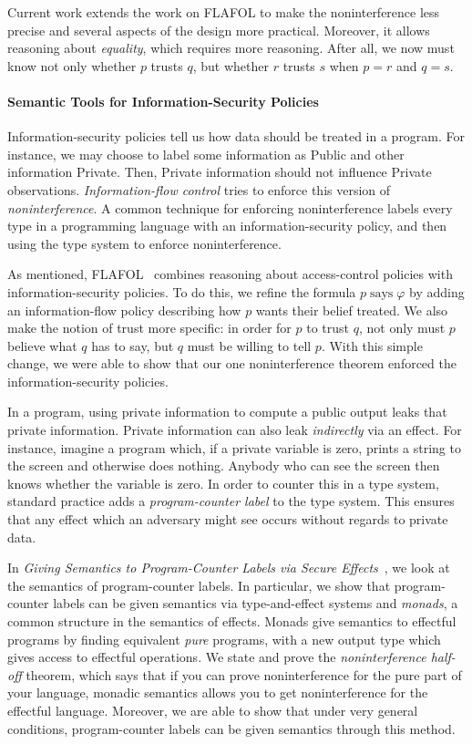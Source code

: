 \documentclass{article}
\theoremstyle{definition}
\begin{document}
Current work extends the work on FLAFOL to make the noninterference less precise and several aspects of the design more practical.
Moreover, it allows reasoning about \emph{equality}, which requires more reasoning.
After all, we now must know not only whether $p$ trusts $q$, but whether $r$ trusts $s$ when $p = r$ and $q = s$.

\paragraph{Semantic Tools for Information-Security Policies}
Information-security policies tell us how data should be treated in a program.
For instance, we may choose to label some information as \textsf{Public} and other information \textsf{Private}.
Then, \textsf{Private} information should not influence \textsf{Private} observations.
\emph{Information-flow control} tries to enforce this version of \emph{noninterference}.
A common technique for enforcing noninterference labels every type in a programming language with an information-security policy, and then using the type system to enforce noninterference.

As mentioned, FLAFOL~\citep{HirschACAT20} combines reasoning about access-control policies with information-security policies.
To do this, we refine the formula $p \mathrel{\textrm{says}} \varphi$ by adding an information-flow policy describing how $p$ wants their belief treated.
We also make the notion of trust more specific: in order for $p$ to trust $q$, not only must $p$ believe what $q$ has to say, but $q$ must be willing to tell $p$.
With this simple change, we were able to show that our one noninterference theorem enforced the information-security policies.

In a program, using private information to compute a public output leaks that private information.
Private information can also leak \emph{indirectly} via an effect.
For instance, imagine a program which, if a private variable is zero, prints a string to the screen and otherwise does nothing.
Anybody who can see the screen then knows whether the variable is zero.
In order to counter this in a type system, standard practice adds a \emph{program-counter label} to the type system.
This ensures that any effect which an adversary might see occurs without regards to private data.

In \textit{Giving Semantics to Program-Counter Labels via Secure Effects}~\citep{HirschC21}, we look at the semantics of program-counter labels.
In particular, we show that program-counter labels can be given semantics via type-and-effect systems and \emph{monads}, a common structure in the semantics of effects.
Monads give semantics to effectful programs by finding equivalent \emph{pure} programs, with a new output type which gives access to effectful operations.
We state and prove the \emph{noninterference half-off} theorem, which says that if you can prove noninterference for the pure part of your language, monadic semantics allows you to get noninterference for the effectful language.
Moreover, we are able to show that under very general conditions, program-counter labels can be given semantics through this method.
\end{document}
